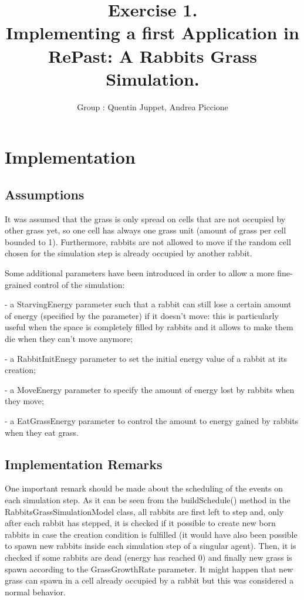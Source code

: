 \documentclass[11pt]{article}
\title{\bf Exercise 1.\\ Implementing a first Application in RePast: A Rabbits Grass Simulation.}
\author{Group \textnumero24: Quentin Juppet, Andrea Piccione}
\begin{document}
\maketitle

\section{Implementation}

\subsection{Assumptions}
It was assumed that the grass is only spread on cells that are not occupied by other grass yet, so one cell has always one grass unit (amount of grass per cell bounded to 1). Furthermore, rabbits are not allowed to move if the random cell chosen for the simulation step is already occupied by another rabbit. 

Some additional parameters have been introduced in order to allow a more fine-grained control of the simulation:

- a StarvingEnergy parameter such that a rabbit can still lose a certain amount of energy (specified by the parameter) if it doesn't move: this is particularly useful when the space is completely filled by rabbits and it allows to make them die when they can't move anymore;

- a RabbitInitEnegy parameter to set the initial energy value of a rabbit at its creation; 

- a MoveEnergy parameter to specify the amount of energy lost by rabbits when they move;

- a EatGrassEnergy parameter to control the amount to energy gained by rabbits when they eat grass.


\subsection{Implementation Remarks}
One important remark should be made about the scheduling of the events on each simulation step. As it can be seen from the buildSchedule() method in the RabbitsGrassSimulationModel class, all rabbits are first left to step and, only after each rabbit has stepped, it is checked if it possible to create new born rabbits in case the creation condition is fulfilled (it would have also been possible to spawn new rabbits inside each simulation step of a singular agent). Then, it is checked if some rabbits are dead (energy has reached 0) and finally new grass is spawn according to the GrassGrowthRate parameter. It might happen that new grass can spawn in a cell already occupied by a rabbit but this was considered a normal behavior.
\end{document}
